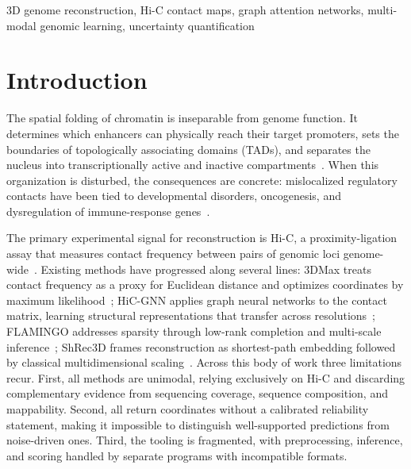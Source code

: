 \documentclass[conference]{IEEEtran}
\begin{document}
\begin{IEEEkeywords}
3D genome reconstruction, Hi-C contact maps, graph attention networks, multi-modal genomic learning, uncertainty quantification
\end{IEEEkeywords}

\section{Introduction}

The spatial folding of chromatin is inseparable from genome function. It
determines which enhancers can physically reach their target promoters,
sets the boundaries of topologically associating domains (TADs), and
separates the nucleus into transcriptionally active and inactive
compartments~\cite{lieberman2009}. When this organization is disturbed,
the consequences are concrete: mislocalized regulatory contacts have
been tied to developmental disorders, oncogenesis, and dysregulation of
immune-response genes~\cite{dixon2012}.

The primary experimental signal for reconstruction is Hi-C, a
proximity-ligation assay that measures contact frequency between pairs
of genomic loci genome-wide~\cite{rao2014}. Existing methods have
progressed along several lines: 3DMax treats contact frequency as a
proxy for Euclidean distance and optimizes coordinates by maximum
likelihood~\cite{oluwadare2018}; HiC-GNN applies graph neural networks
to the contact matrix, learning structural representations that transfer
across resolutions~\cite{hicgnn2022}; FLAMINGO addresses sparsity
through low-rank completion and multi-scale
inference~\cite{flamingo2022}; ShRec3D frames reconstruction as
shortest-path embedding followed by classical
multidimensional scaling~\cite{lesne2014}. Across this body of work
three limitations recur. First, all methods are unimodal, relying
exclusively on Hi-C and discarding complementary evidence from
sequencing coverage, sequence composition, and mappability. Second, all
return coordinates without a calibrated reliability statement, making it
impossible to distinguish well-supported predictions from noise-driven
ones. Third, the tooling is fragmented, with preprocessing, inference,
and scoring handled by separate programs with incompatible formats.
\end{document}
